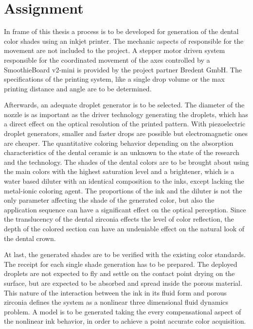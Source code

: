 \cleardoublepage
{}


\chapter{Assignment}
\label{sec:aufgabenstellung}
 In frame of this thesis a process is to be developed for generation of the dental color shades using an inkjet printer.  The mechanic aspects of responsible for the movement are not included to the project. A stepper motor driven system responsible for the coordinated movement of the axes controlled by a SmoothieBoard v2-mini is provided by the project partner Bredent GmbH. The specifications of the printing system, like a single drop volume or the max printing distance and angle are to be determined. 
 
 Afterwards, an adequate droplet generator is to be selected. The diameter of the nozzle is as important as the driver technology generating the droplets, which has a direct effect on the optical resolution of the printed pattern. With piezoelectric droplet generators, smaller and faster drops are possible but electromagnetic ones are cheaper. The quantitative coloring behavior depending on the absorption characteristics of the dental ceramic is an unknown to the state of the research and the technology. The shades of the dental colors are to be brought about using the main colors with the highest saturation level and a brightener, which is a water based diluter with  an identical composition to the inks, except lacking the metal-ionic coloring agent. The proportions of the ink and the diluter is not the only parameter affecting the shade of the generated color, but also the application sequence can have a significant effect on the optical perception. Since the translucency of the dental zirconia effects the level of color reflection, the depth of the colored section can have an undeniable effect on the natural look of the dental crown. 
 
 At last, the generated shades are to be verified with the existing color standards. The receipt for each single shade generation has to be prepared. The deployed droplets are not expected to fly and settle on the contact point drying on the surface, but are expected to be absorbed and spread inside the porous material. This nature of the interaction between the ink in its fluid form and porous zirconia defines the system as a nonlinear three dimensional fluid dynamics problem. A model is to be generated taking the every compensational aspect of the nonlinear ink behavior, in order to achieve a point accurate color acquisition.
 
